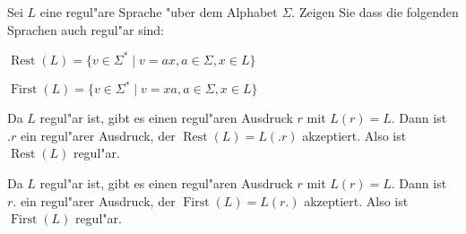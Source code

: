 Sei $L$ eine regul"are Sprache "uber dem Alphabet $\Sigma$.
Zeigen Sie dass die folgenden Sprachen auch regul"ar sind:
\begin{teilaufgaben}
\item $\operatorname{Rest}(L)=\{v \in\Sigma^*\;|\; v=ax, a\in\Sigma, x\in L\}$
\item $\operatorname{First}(L)=\{v \in\Sigma^*\;|\; v=xa, a\in\Sigma, x\in L\}$
\end{teilaufgaben}

\begin{loesung}
\begin{teilaufgaben}
\item Da $L$ regul"ar ist, gibt es einen regul"aren Ausdruck $r$ mit
$L(r)=L$. Dann ist $.r$ ein regul"arer Ausdruck, der
$\operatorname{Rest}(L)=L(.r)$ akzeptiert.
Also ist
$\operatorname{Rest}(L)$ regul"ar.
\item Da $L$ regul"ar ist, gibt es einen regul"aren Ausdruck $r$ mit
$L(r)=L$. Dann ist $r.$ ein regul"arer Ausdruck, der
$\operatorname{First}(L)=L(r.)$ akzeptiert. Also ist
$\operatorname{First}(L)$ regul"ar.
\end{teilaufgaben}
\end{loesung}

